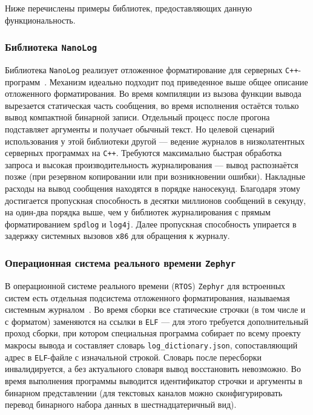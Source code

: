 Ниже перечислены примеры библиотек, предоставляющих данную функциональность.

\subsubsection{Библиотека \texttt{NanoLog}}

Библиотека \texttt{NanoLog} реализует отложенное форматирование для серверных \texttt{C++}-программ~\cite{Yang18NanoLog, Yang20NanoLogThesis}.
Механизм идеально подходит под приведенное выше общее описание отложенного форматирования.
Во время компиляции из вызова функции вывода вырезается статическая часть сообщения, во время исполнения остаётся только вывод компактной бинарной записи.
Отдельный процесс после прогона подставляет аргументы и получает обычный текст.
Но целевой сценарий использования у этой библиотеки другой --- ведение журналов в низколатентных серверных программах на \texttt{C++}.
Требуются максимально быстрая обработка запроса и высокая производительность журналирования --- вывод распознаётся позже (при резервном копировании или при возникновении ошибки).
Накладные расходы на вывод сообщения находятся в порядке наносекунд.
Благодаря этому достигается пропускная способность в десятки миллионов сообщений в секунду, на один-два порядка выше, чем у библиотек журналирования с прямым форматированием \texttt{spdlog} и \texttt{log4j}.
Далее пропускная способность упирается в задержку системных вызовов \texttt{x86} для обращения к журналу.

\subsubsection{Операционная система реального времени \texttt{Zephyr}}

В операционной системе реального времени (\texttt{RTOS}) \texttt{Zephyr} для встроенных систем есть отдельная подсистема отложенного форматирования, называемая системным журналом~\cite{ZephyrDictLog}.
Во время сборки все статические строчки (в том числе и с форматом) заменяются на ссылки в \texttt{ELF} --- для этого требуется дополнительный проход сборки, при котором специальная программа собирает по всему проекту макросы вывода и составляет словарь \texttt{log\_dictionary.json}, сопоставляющий адрес в \texttt{ELF}-файле с изначальной строкой.
Словарь после пересборки инвалидируется, а без актуального словаря вывод восстановить невозможно.
Во время выполнения программы выводится идентификатор строчки и аргументы в бинарном представлении (для текстовых каналов можно сконфигурировать перевод бинарного набора данных в шестнадцатеричный вид).

